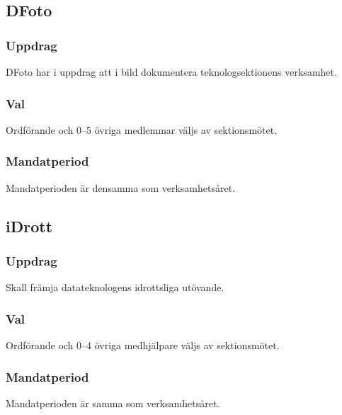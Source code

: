 \subsection{DFoto}
\subsubsection{Uppdrag}
DFoto har i uppdrag att i bild dokumentera teknologsektionens verksamhet.
\subsubsection{Val}
Ordförande och 0--5 övriga medlemmar väljs av sektionsmötet.
\subsubsection{Mandatperiod}
Mandatperioden är densamma som verksamhetsåret.

\subsection{iDrott}
\subsubsection{Uppdrag}
Skall främja datateknologens idrottsliga utövande. 
\subsubsection{Val}
Ordförande och 0--4 övriga medhjälpare väljs av sektionsmötet. 
\subsubsection{Mandatperiod}
Mandatperioden är samma som verksamhetsåret. 

\newpage

